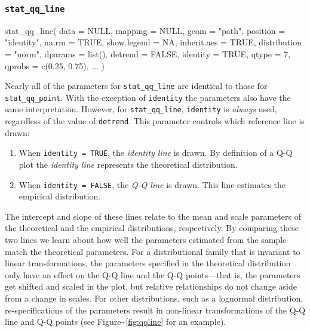 \subsubsection{\texorpdfstring{\texttt{stat\_qq\_line}}{stat\_qq\_line}}\label{stat_qq_line}


\begin{Schunk}
\begin{Sinput}
stat_qq_line(
  data = NULL,
  mapping = NULL,
  geom = "path",
  position = "identity",
  na.rm = TRUE,
  show.legend = NA,
  inherit.aes = TRUE,
  distribution = "norm",
  dparams = list(),
  detrend = FALSE,
  identity = TRUE,
  qtype = 7,
  qprobs = c(0.25, 0.75),
  ...
  )
\end{Sinput}
\end{Schunk}

Nearly all of the parameters for \texttt{stat\_qq\_line} are identical
to those for \texttt{stat\_qq\_point}. With the exception of
\texttt{identity} the parameters also have the same interpretation.
However, for \texttt{stat\_qq\_line}, \texttt{identity} is \emph{always}
used, regardless of the value of \texttt{detrend}. This parameter
controls which reference line is drawn:


\begin{enumerate}
\def\labelenumi{\alph{enumi})}
\tightlist
\item
  When \texttt{identity\ =\ TRUE}, the \emph{identity line} is drawn. By
  definition of a Q-Q plot the \emph{identity line} represents the
  theoretical distribution.
\item
  When \texttt{identity\ =\ FALSE}, the \emph{Q-Q line} is drawn. This
  line estimates the empirical distribution.
\end{enumerate}

The intercept and slope of these lines relate to the mean and scale
parameters of the theoretical and the empirical distributions,
respectively. By comparing these two lines we learn about how well the
parameters estimated from the sample match the theoretical parameters.
For a distributional family that is invariant to linear transformations,
the parameters specified in the theoretical distribution only have an
effect on the Q-Q line and the Q-Q points---that is, the parameters get
shifted and scaled in the plot, but relative relationships do not change
aside from a change in scales. For other distributions, such as a
lognormal distribution, re-specifications of the parameters result in
non-linear transformations of the Q-Q line and Q-Q points (see
Figure\textasciitilde{}\ref{fig:qqline} for an example).

